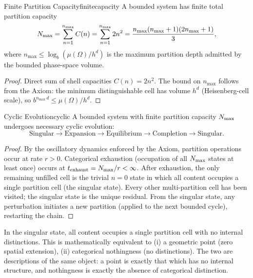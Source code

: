 \begin{consequence}{Finite Partition Capacity}{finitecapacity}
  A bounded system has finite total partition capacity
  \begin{equation}
    N_{\max} = \sum_{n=1}^{n_{\max}}C(n) = \sum_{n=1}^{n_{\max}}2n^{2}
           = \frac{n_{\max}(n_{\max}+1)(2n_{\max}+1)}{3},
  \end{equation}
  where $n_{\max} \leq \log_{b}(\mu(\Omega)/h^{d})$ is the maximum partition
  depth admitted by the bounded phase-space volume.
\end{consequence}

\begin{proof}
Direct sum of shell capacities $C(n) = 2n^{2}$.
The bound on $n_{\max}$ follows from the Axiom: the minimum distinguishable
cell has volume $h^{d}$ (Heisenberg-cell scale), so
$b^{n_{\max}\,d} \leq \mu(\Omega)/h^{d}$.
\end{proof}

\begin{consequence}{Cyclic Evolution}{cyclic}
  A bounded system with finite partition capacity $N_{\max}$ undergoes necessary
  cyclic evolution:
  \begin{equation}
    \mathrm{Singular}
    \to \mathrm{Expansion}
    \to \mathrm{Equilibrium}
    \to \mathrm{Completion}
    \to \mathrm{Singular}.
  \end{equation}
\end{consequence}

\begin{proof}
By the oscillatory dynamics enforced by the Axiom, partition operations occur
at rate $r > 0$.
Categorical exhaustion (occupation of all $N_{\max}$ states at least once) occurs
at $t_{\mathrm{exhaust}} = N_{\max}/r < \infty$.
After exhaustion, the only remaining unfilled cell is the trivial $n = 0$ state
in which all content occupies a single partition cell (the singular state).
Every other multi-partition cell has been visited; the singular state is the
unique residual.
From the singular state, any perturbation initiates a new partition (applied to
the next bounded cycle), restarting the chain.
\end{proof}

\begin{remark}
In the singular state, all content occupies a single partition cell with no
internal distinctions.
This is mathematically equivalent to (i) a geometric point (zero spatial
extension), (ii) categorical nothingness (no distinctions).
The two are descriptions of the same object: a point is exactly that which has
no internal structure, and nothingness is exactly the absence of categorical
distinction.
\end{remark}

